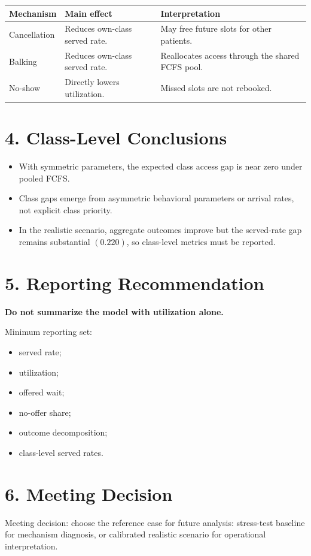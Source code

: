 \documentclass[11pt]{article}
\begin{document}
\begin{tabularx}{\textwidth}{L{0.22\textwidth} Y Y}
\toprule
Mechanism & Main effect & Interpretation \\
\midrule
Cancellation & Reduces own-class served rate. & May free future slots for other patients. \\
Balking & Reduces own-class served rate. & Reallocates access through the shared FCFS pool. \\
No-show & Directly lowers utilization. & Missed slots are not rebooked. \\
\bottomrule
\end{tabularx}

\newpage

\section*{4. Class-Level Conclusions}

\begin{itemize}
\item With symmetric parameters, the expected class access gap is near zero under pooled FCFS.
\item Class gaps emerge from asymmetric behavioral parameters or arrival rates, not explicit class priority.
\item In the realistic scenario, aggregate outcomes improve but the served-rate gap remains substantial \((0.220)\), so class-level metrics must be reported.
\end{itemize}

\section*{5. Reporting Recommendation}

\begin{recommendationbox}
{\large\bfseries Do not summarize the model with utilization alone.}

\vspace{0.5em}

Minimum reporting set:

\begin{itemize}
\item served rate;
\item utilization;
\item offered wait;
\item no-offer share;
\item outcome decomposition;
\item class-level served rates.
\end{itemize}
\end{recommendationbox}

\section*{6. Meeting Decision}

Meeting decision: choose the reference case for future analysis: stress-test baseline for mechanism diagnosis, or calibrated realistic scenario for operational interpretation.
\end{document}
